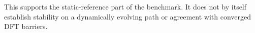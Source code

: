 This supports the static-reference part of the benchmark. It does not by itself establish stability on a dynamically evolving path or agreement with converged DFT barriers.
